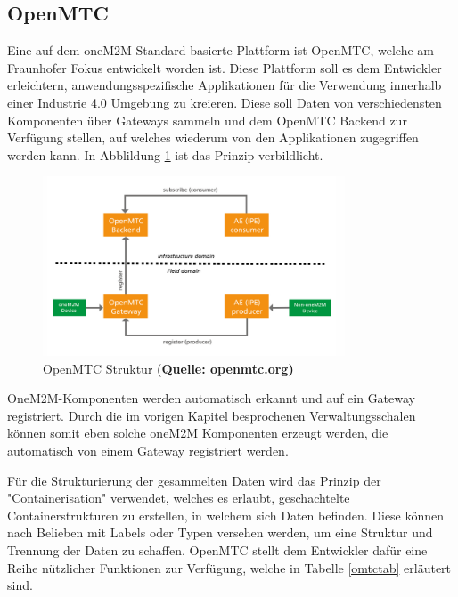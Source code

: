 \documentclass[
	12pt,								%
	DIV10,
	a4paper,         		%
	oneside,						%
	parskip=half,				%
	headings=normal,			%
	listof=totoc,					%
	bibliography=totoc,						%
	index=totoc,						%
	final								%
]{scrartcl}
\begin{document}
\subsection{OpenMTC}
Eine auf dem oneM2M Standard basierte Plattform ist OpenMTC, welche am Fraunhofer Fokus entwickelt worden ist. Diese Plattform soll es dem Entwickler erleichtern, anwendungsspezifische Applikationen für die Verwendung innerhalb einer Industrie 4.0 Umgebung zu kreieren. Diese soll Daten von verschiedensten Komponenten über Gateways sammeln und dem OpenMTC Backend zur Verfügung stellen, auf welches wiederum von den Applikationen zugegriffen werden kann. In Abblildung \ref{omtc} ist das Prinzip verbildlicht.

\begin{figure}[H]
\centering
\includegraphics[width=0.8\textwidth]{omtc1}
\caption{OpenMTC Struktur (\textbf{Quelle: openmtc.org)}}
\label{omtc}
\end{figure}

OneM2M-Komponenten werden automatisch erkannt und auf ein Gateway registriert. Durch die im vorigen Kapitel besprochenen Verwaltungsschalen können somit eben solche oneM2M Komponenten erzeugt werden, die automatisch von einem Gateway registriert werden. 

Für die Strukturierung der gesammelten Daten wird das Prinzip der "Containerisation" verwendet, welches es erlaubt, geschachtelte Containerstrukturen zu erstellen, in welchem sich Daten befinden. Diese können nach Belieben mit Labels oder Typen versehen werden, um eine Struktur und Trennung der Daten zu schaffen.
OpenMTC stellt dem Entwickler dafür eine Reihe nützlicher Funktionen zur Verfügung, welche in Tabelle \ref{omtctab} erläutert sind.
\end{document}
